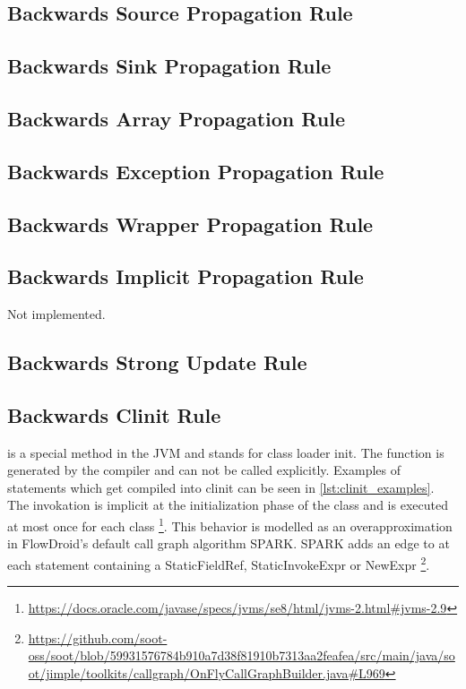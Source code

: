 \documentclass[../draft.tex]{subfiles}
\begin{document}
    \subsection{Backwards Source Propagation Rule}\label{s:sourcerule}

    \subsection{Backwards Sink Propagation Rule}

    \subsection{Backwards Array Propagation Rule}

    \subsection{Backwards Exception Propagation Rule}

    \subsection{Backwards Wrapper Propagation Rule}

    \subsection{Backwards Implicit Propagation Rule}
    Not implemented.

    \subsection{Backwards Strong Update Rule}

    \subsection{Backwards Clinit Rule}
     is a special method in the JVM and stands for class loader init. The function is generated by the compiler and can not be called explicitly. Examples of statements which get compiled into clinit can be seen in \autoref{lst:clinit_examples}. The invokation is implicit at the initialization phase of the class and is executed at most once for each class \footnote{\url{https://docs.oracle.com/javase/specs/jvms/se8/html/jvms-2.html\#jvms-2.9}}. 
    This behavior is modelled as an overapproximation in FlowDroid's default call graph algorithm SPARK. SPARK adds an edge to  at each statement containing a StaticFieldRef, StaticInvokeExpr or NewExpr \footnote{\url{https://github.com/soot-oss/soot/blob/59931576784b910a7d38f81910b7313aa2feafea/src/main/java/soot/jimple/toolkits/callgraph/OnFlyCallGraphBuilder.java\#L969}}.
   
\end{document}
